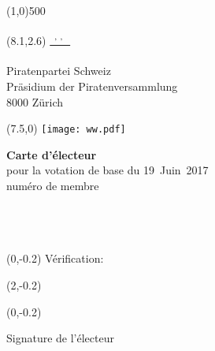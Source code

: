 \documentclass[11pt, a4paper]{scrartcl}
\begin{document}
{\begin{minipage}[t][13.42cm][t]{\textwidth}
\end{minipage}

\line(1,0){500}
\vspace{1cm}

\begin{minipage}[t][12.5cm][t]{\textwidth}

\begin{textblock}{9}(8.1,2.6)
\underline{\textsuperscript*{ \givenname~\surname, \street, \postalcode~\location }} \\
\vspace{-0.3cm} \\
Piratenpartei Schweiz \\
Präsidium der Piratenversammlung \\
8000 Zürich
\end{textblock}

\begin{textblock}{6}(7.5,0)
\texttt{[image: ww.pdf]}
\end{textblock}

{\LARGE\textbf{Carte d'électeur}} \\
pour la votation de base du 19~Juin~2017 \\

numéro de membre \textbf{\id}   \\
\givenname~\surname         \\
\street                     \\
\postalcode~\location       \\
%

\begin{textblock}{6}(0,-0.2)
Vérification:
\end{textblock}

\begin{textblock}{4}(2,-0.2)
\raggedright
\code
\end{textblock}

\vspace{4cm}

\begin{textblock}{6}(0,-0.2)
\begin{framed}
Signature de l'électeur \\
\vspace{1.5cm} ~ \\
\end{framed}
\end{textblock}


\end{minipage}}
\end{document}
